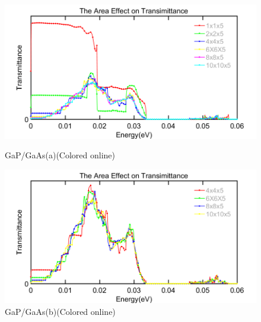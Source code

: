 \begin{figure}
\begin{minipage}[t]{0.5\linewidth}
\centering
\includegraphics[width=\textwidth]{GaPGaAs_Big.png}
\caption{GaP/GaAs(a)(Colored online)}
\label{fig:Gaa}
\end{minipage}%
\begin{minipage}[t]{0.5\linewidth}
\centering
\includegraphics[width=\textwidth]{GaPGaAs_sub.png}
\caption{GaP/GaAs(b)(Colored online)}
\label{fig:Gab}
\end{minipage}
\end{figure}
\par
\hspace{-0.2in}
